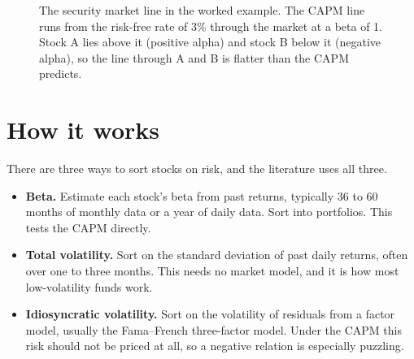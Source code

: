 \begin{figure}[htbp]
\centering
{}
\caption{The security market line in the worked example. The CAPM line runs from the risk-free rate of 3\% through the market at a beta of 1. Stock A lies above it (positive alpha) and stock B below it (negative alpha), so the line through A and B is flatter than the CAPM predicts.}
\label{fig:12-sml}
\end{figure}

\section{How it works}
\label{sec:12-how}

There are three ways to sort stocks on risk, and the literature uses all three.

\begin{itemize}
  \item \textbf{Beta.} Estimate each stock's beta from past returns, typically 36 to 60 months of monthly data or a year of daily data. Sort into portfolios. This tests the CAPM directly.
  \item \textbf{Total volatility.} Sort on the standard deviation of past daily returns, often over one to three months. This needs no market model, and it is how most low-volatility funds work.
  \item \textbf{Idiosyncratic volatility.} Sort on the volatility of residuals from a factor model, usually the Fama--French three-factor model. Under the CAPM this risk should not be priced at all, so a negative relation is especially puzzling.
\end{itemize}

